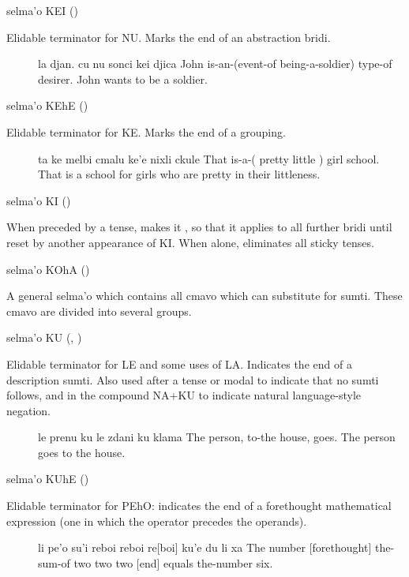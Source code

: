 selma'o KEI () 

Elidable terminator for NU. Marks the end of an abstraction
    bridi.
\begin{description}
\item[] la djan. cu nu sonci kei djica John is-an-(event-of being-a-soldier) type-of desirer. John wants to be a soldier.
\end{description}

selma'o KEhE () 

Elidable terminator for KE. Marks the end of a grouping.
\begin{description}
\item[] ta ke melbi cmalu ke'e nixli ckule That is-a-( pretty little ) girl school. That is a school for girls who are pretty in their littleness.
\end{description}

selma'o KI () 

When preceded by a tense, makes it , so that it
    applies to all further bridi until reset by another appearance
    of KI. When alone, eliminates all sticky tenses.

selma'o KOhA ()

A general selma'o which contains all cmavo which can
    substitute for sumti. These cmavo are divided into several
    groups.

selma'o KU (, ) 

Elidable terminator for LE and some uses of LA. Indicates
    the end of a description sumti. Also used after a tense or
    modal to indicate that no sumti follows, and in the compound
    NA+KU to indicate natural language-style negation.
\begin{description}
\item[] le prenu ku le zdani ku klama The person, to-the house, goes. The person goes to the house.
\end{description}

selma'o KUhE () 

Elidable terminator for PEhO: indicates the end of a
    forethought mathematical expression (one in which the operator
    precedes the operands).
\begin{description}
\item[] li pe'o su'i reboi reboi re[boi] ku'e du li xa The number [forethought] the-sum-of two two two [end] equals the-number six.
\end{description}

